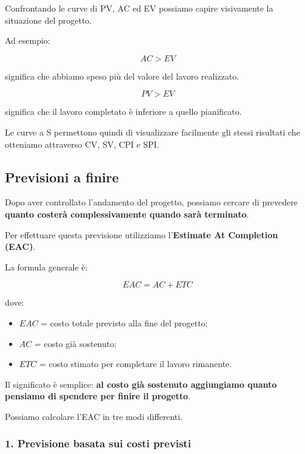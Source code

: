 \noindent Confrontando le curve di PV, AC ed EV
possiamo capire visivamente
la situazione del progetto.

\medskip

\noindent Ad esempio:

\[
AC>EV
\]

\noindent significa che abbiamo speso
più del valore del lavoro realizzato.

\[
PV>EV
\]

\noindent significa che il lavoro completato
è inferiore a quello pianificato.

\medskip

\noindent Le curve a S permettono quindi
di visualizzare facilmente
gli stessi risultati che otteniamo
attraverso CV, SV, CPI e SPI.


\subsection{Previsioni a finire}

\noindent Dopo aver controllato l'andamento
del progetto, possiamo cercare di prevedere
\textbf{quanto costerà complessivamente
quando sarà terminato}.

\medskip

\noindent Per effettuare questa previsione
utilizziamo l'\textbf{Estimate At Completion (EAC)}.

\medskip

\noindent La formula generale è:

\[
\boxed{
EAC=AC+ETC
}
\]

\noindent dove:

\begin{itemize}
    \item $EAC$ = costo totale previsto
    alla fine del progetto;

    \item $AC$ = costo già sostenuto;

    \item $ETC$ = costo stimato
    per completare il lavoro rimanente.
\end{itemize}

\noindent Il significato è semplice:
\textbf{al costo già sostenuto
aggiungiamo quanto pensiamo
di spendere per finire il progetto}.

\medskip

\noindent Possiamo calcolare l'EAC
in tre modi differenti.


\subsubsection*{1. Previsione basata sui costi previsti}

